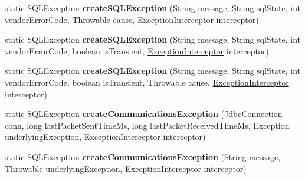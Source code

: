 \begin{DoxyCompactItemize}
\item 
\mbox{\label{classcom_1_1mysql_1_1cj_1_1jdbc_1_1exceptions_1_1_s_q_l_error_a466ce514f51b53a59840b41bfa37e0cf}} 
static S\+Q\+L\+Exception {\bfseries create\+S\+Q\+L\+Exception} (String message, String sql\+State, int vendor\+Error\+Code, Throwable cause, \mbox{\hyperlink{interfacecom_1_1mysql_1_1cj_1_1exceptions_1_1_exception_interceptor}{Exception\+Interceptor}} interceptor)
\item 
\mbox{\label{classcom_1_1mysql_1_1cj_1_1jdbc_1_1exceptions_1_1_s_q_l_error_afaec4b0c520a82a09774a4fc1e1c031c}} 
static S\+Q\+L\+Exception {\bfseries create\+S\+Q\+L\+Exception} (String message, String sql\+State, int vendor\+Error\+Code, boolean is\+Transient, \mbox{\hyperlink{interfacecom_1_1mysql_1_1cj_1_1exceptions_1_1_exception_interceptor}{Exception\+Interceptor}} interceptor)
\item 
\mbox{\label{classcom_1_1mysql_1_1cj_1_1jdbc_1_1exceptions_1_1_s_q_l_error_a40f7682ec06e149fd043197f32633fb6}} 
static S\+Q\+L\+Exception {\bfseries create\+S\+Q\+L\+Exception} (String message, String sql\+State, int vendor\+Error\+Code, boolean is\+Transient, Throwable cause, \mbox{\hyperlink{interfacecom_1_1mysql_1_1cj_1_1exceptions_1_1_exception_interceptor}{Exception\+Interceptor}} interceptor)
\item 
\mbox{\label{classcom_1_1mysql_1_1cj_1_1jdbc_1_1exceptions_1_1_s_q_l_error_a43b88f243a21b18c87df8376ec18797a}} 
static S\+Q\+L\+Exception {\bfseries create\+Communications\+Exception} (\mbox{\hyperlink{interfacecom_1_1mysql_1_1cj_1_1jdbc_1_1_jdbc_connection}{Jdbc\+Connection}} conn, long last\+Packet\+Sent\+Time\+Ms, long last\+Packet\+Received\+Time\+Ms, Exception underlying\+Exception, \mbox{\hyperlink{interfacecom_1_1mysql_1_1cj_1_1exceptions_1_1_exception_interceptor}{Exception\+Interceptor}} interceptor)
\item 
\mbox{\label{classcom_1_1mysql_1_1cj_1_1jdbc_1_1exceptions_1_1_s_q_l_error_ad901a4f9ecc207b09860f8f8736829ee}} 
static S\+Q\+L\+Exception {\bfseries create\+Communications\+Exception} (String message, Throwable underlying\+Exception, \mbox{\hyperlink{interfacecom_1_1mysql_1_1cj_1_1exceptions_1_1_exception_interceptor}{Exception\+Interceptor}} interceptor)

\end{DoxyCompactItemize}
